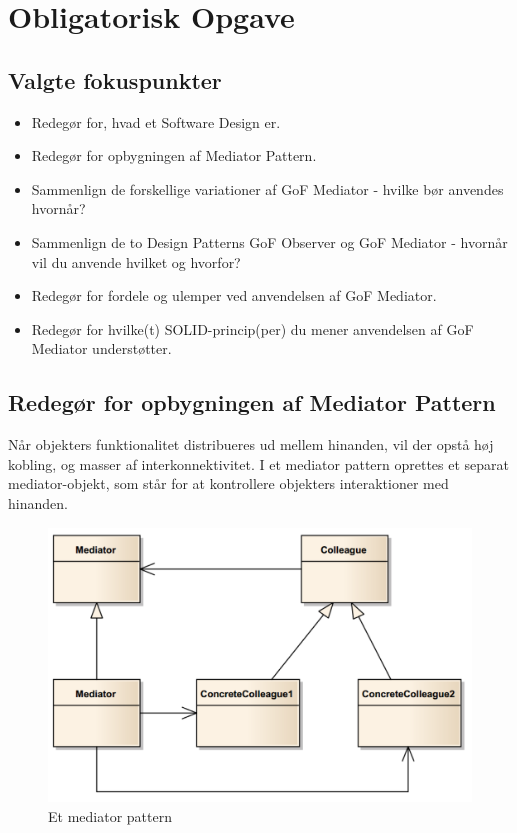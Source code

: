\section{Obligatorisk Opgave}

\subsection{Valgte fokuspunkter}

\begin{itemize}
	\item Redegør for, hvad et Software Design er.
	\item Redegør for opbygningen af Mediator Pattern.
	\item Sammenlign de forskellige variationer af GoF Mediator - hvilke bør anvendes hvornår?
	\item Sammenlign de to Design Patterns GoF Observer og GoF Mediator - hvornår vil du anvende hvilket og hvorfor?
	\item Redegør for fordele og ulemper ved anvendelsen af GoF Mediator.
	\item Redegør for hvilke(t) SOLID-princip(per) du mener anvendelsen af GoF Mediator understøtter.
\end{itemize}



\subsection{Redegør for opbygningen af Mediator Pattern}
Når objekters funktionalitet distribueres ud mellem hinanden, vil der opstå høj kobling, og masser
af interkonnektivitet. I et mediator pattern oprettes et separat mediator-objekt, som står for at
kontrollere objekters interaktioner med hinanden.

\begin{figure}[H]
	\centering
	\includegraphics[width=0.7\linewidth]{figs/mediator/mediatorPattern.PNG}
	\caption{Et mediator pattern}
	\label{fig:mediatorPattern}
\end{figure}

